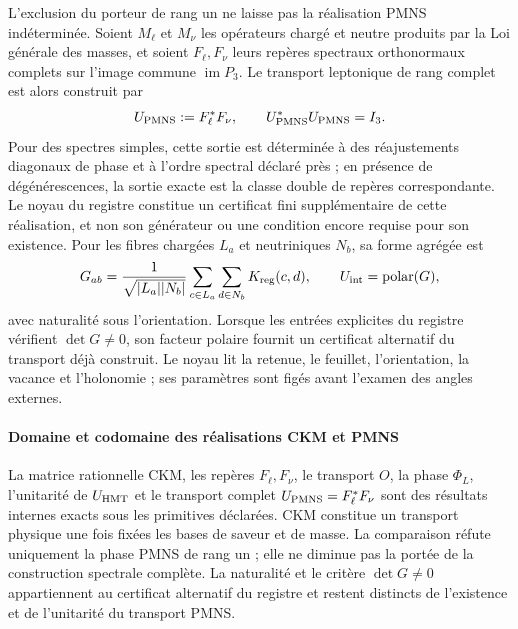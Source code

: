 L'exclusion du porteur de rang un ne laisse pas la réalisation PMNS indéterminée. Soient \(M_\ell\) et \(M_\nu\) les opérateurs chargé et neutre produits par la Loi générale des masses, et soient \(F_\ell,F_\nu\) leurs repères spectraux orthonormaux complets sur l'image commune \(\operatorname{im}P_3\). Le transport leptonique de rang complet est alors construit par
\[
 U_{\rm PMNS}:=F_\ell^*F_\nu,
 \qquad
 U_{\rm PMNS}^*U_{\rm PMNS}=I_3.
\]
Pour des spectres simples, cette sortie est déterminée à des réajustements diagonaux de phase et à l'ordre spectral déclaré près ; en présence de dégénérescences, la sortie exacte est la classe double de repères correspondante. Le noyau du registre constitue un certificat fini supplémentaire de cette réalisation, et non son générateur ou une condition encore requise pour son existence. Pour les fibres chargées \(L_a\) et neutriniques \(N_b\), sa forme agrégée est
\[
 G_{ab}=\frac{1}{\sqrt{|L_a||N_b|}}
 \sum_{c\in L_a}\sum_{d\in N_b}K_{\rm reg}(c,d),
 \qquad U_{\rm int}=\operatorname{polar}(G),
\]
avec naturalité sous l'orientation. Lorsque les entrées explicites du registre vérifient \(\det G\ne0\), son facteur polaire fournit un certificat alternatif du transport déjà construit. Le noyau lit la retenue, le feuillet, l'orientation, la vacance et l'holonomie ; ses paramètres sont figés avant l'examen des angles externes.

\paragraph{Domaine et codomaine des réalisations CKM et PMNS}
La matrice rationnelle CKM, les repères \(F_\ell,F_\nu\), le transport \(O\), la phase \(\Phi_L\), l'unitarité de \(U_{\rm HMT}\) et le transport complet \(U_{\rm PMNS}=F_\ell^*F_\nu\) sont des résultats internes exacts sous les primitives déclarées. CKM constitue un transport physique une fois fixées les bases de saveur et de masse. La comparaison réfute uniquement la phase PMNS de rang un ; elle ne diminue pas la portée de la construction spectrale complète. La naturalité et le critère \(\det G\ne0\) appartiennent au certificat alternatif du registre et restent distincts de l'existence et de l'unitarité du transport PMNS.
